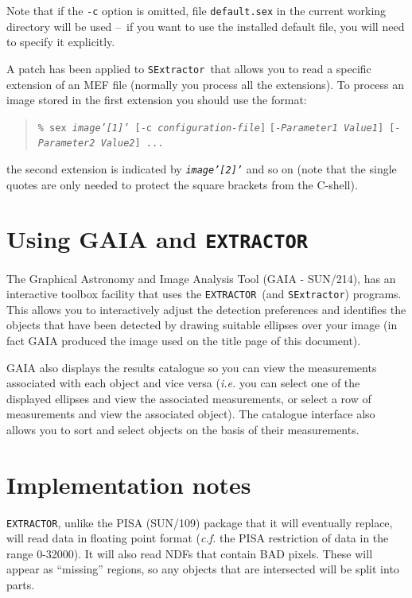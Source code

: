 \documentclass[twoside,11pt]{article}
\newcommand{\xref}[3]{#1}
\newcommand{\xlabel}[1]{}
\renewcommand{\_}{\texttt{\symbol{95}}}
\newcommand{\EXTRACTOR}{\texttt{EXTRACTOR}}
\newcommand{\SExtractor}{\texttt{SExtractor}}
\newcommand{\dash}{--}
\newcommand{\dash}{-}
\begin{document}
Note that if the \texttt{-c} option is omitted, file
\texttt{default.sex} in the current working directory will be used
\dash\ if you want to use the installed default file, you will need to
specify it explicitly.

A patch has been applied to \SExtractor\ that allows you to read a specific
extension of an MEF file (normally you process all the extensions). 
To process an image stored in the first extension you should use the format:
\begin{quote}
\texttt{\% sex \textit{image'[1]'} [-c \textit{configuration-file}]}
\texttt{[-\textit{Parameter1 Value1}] [-\textit{Parameter2 Value2}] ...}
\end{quote}
the second extension is indicated by \texttt{\textit{image'[2]'}} and
so on (note that the single quotes are only needed to protect the square
brackets from the C-shell).

\section{\xlabel{using_gaia_and_extractor}Using GAIA and \EXTRACTOR}
The Graphical Astronomy and Image Analysis Tool (GAIA -
\xref{SUN/214}{sun214}{}), has an interactive toolbox facility that
uses the \EXTRACTOR\ (and \SExtractor) programs. This allows you to
interactively adjust the detection preferences and identifies the
objects that have been detected by drawing suitable ellipses over your
image (in fact GAIA produced the image used on the title page of this
document).

GAIA also displays the results catalogue so you can view the
measurements associated with each object and vice versa (\textit{i.e.}
you can select one of the displayed ellipses and view the associated
measurements, or select a row of measurements and view the associated
object). The catalogue interface also allows you to sort and select
objects on the basis of their measurements.

\section{\label{implementation_notes}\xlabel{implementation_notes}Implementation notes}

\EXTRACTOR, unlike the PISA (\xref{SUN/109}{sun109}{}) package that it
will eventually replace, will read data in floating point format
(\textit{c.f.} the PISA restriction of data in the range 0-32000).  It will
also read NDFs that contain BAD pixels. These will appear as
``missing'' regions, so any objects that are intersected will be split
into parts.
\end{document}
